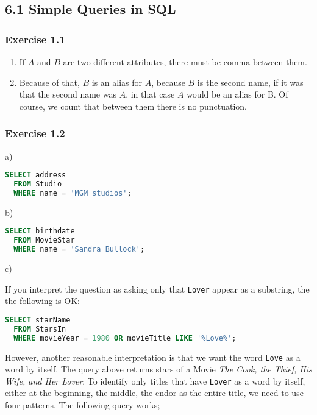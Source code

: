 \subsection*{6.1 Simple Queries in SQL}

\subsubsection*{Exercise 1.1}

\begin{enumerate}
  \item If $A$ and $B$ are two different attributes, there
        must be comma between them.
  \item Because of that, $B$ is an alias for $A$, because
        $B$ is the second name, if it was that the second
        name was $A$, in that case $A$ would be an alias
        for B. Of course, we count that between them there
        is no punctuation.
\end{enumerate}

\subsubsection*{Exercise 1.2}


a)

\begin{lstlisting}[language=sql]
  SELECT address
  FROM Studio
  WHERE name = 'MGM studios';
\end{lstlisting}

b)

\begin{lstlisting}[language=sql]
  SELECT birthdate
  FROM MovieStar
  WHERE name = 'Sandra Bullock';
\end{lstlisting}

\hypertarget{Solution6.1.2c}{c)}

If you interpret the question as asking only that \verb|Lover|
appear as a substring, the the following is OK:

\begin{lstlisting}[language=sql]
  SELECT starName
  FROM StarsIn
  WHERE movieYear = 1980 OR movieTitle LIKE '%Love%';
\end{lstlisting}

However, another reasonable interpretation is that we want
the word \verb|Love| as a word by itself. The query above
returns stars of a Movie \emph{The Cook, the Thief, His
Wife, and Her Lover}. To identify only titles that have
\verb|Lover| as a word by itself, either at the beginning,
the middle, the endor as the entire title, we need to use
four patterns. The following query works;

